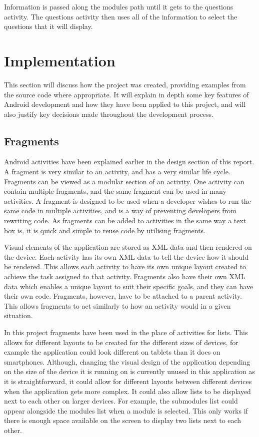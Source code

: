 \documentclass{article}
\begin{document}
Information is passed along the modules path until it gets to the questions activity. The questions activity then uses all of the information to select the questions that it will display. \par

\section{Implementation}
\label{section:implementation}

This section will discuss how the project was created, providing examples from the source code where appropriate. It will explain in depth some key features of Android development and how they have been applied to this project, and will also justify key decisions made throughout the development process. 

\subsection{Fragments}

Android activities have been explained earlier in the design section of this report. A fragment is very similar to an activity, and has a very similar life cycle. Fragments can be viewed as a modular section of an activity. One activity can contain multiple fragments, and the same fragment can be used in many activities. A fragment is designed to be used when a developer wishes to run the same code in multiple activities, and is a way of preventing developers from rewriting code. As fragments can be added to activities in the same way a text box is, it is quick and simple to reuse code by utilising fragments. \par

Visual elements of the application are stored as XML data and then rendered on the device. Each activity has its own XML data to tell the device how it should be rendered. This allows each activity to have its own unique layout created to achieve the task assigned to that activity. Fragments also have their own XML data which enables a unique layout to suit their specific goals, and they can have their own code. Fragments, however, have to be attached to a parent activity. This allows fragments to act similarly to how an activity would in a given situation. \par

In this project fragments have been used in the place of activities for lists. This allows for different layouts to be created for the different sizes of devices, for example the application could look different on tablets than it does on smartphones. Although, changing the visual design of the application depending on the size of the device it is running on is currently unused in this application as it is straightforward, it could allow for different layouts between different devices when the application gets more complex. It could also allow lists to be displayed next to each other on larger devices. For example, the submodules list could appear alongside the modules list when a module is selected. This only works if there is enough space available on the screen to display two lists next to each other. \par
\end{document}
